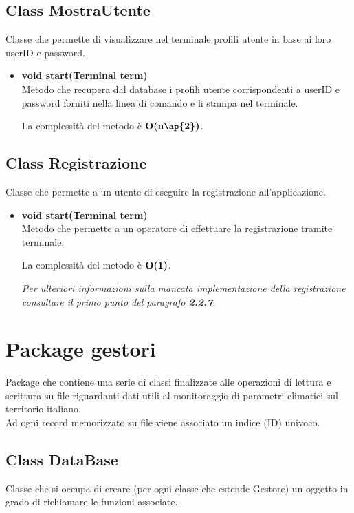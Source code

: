 \documentclass[a4paper, 12pt]{scrreprt}
\begin{document}
			\subsection{Class MostraUtente}
			Classe che permette di visualizzare nel terminale profili utente in base ai loro userID e password.
			\begin{itemize}
				\item \textbf{void start(Terminal term)}
				\\Metodo che recupera dal database i profili utente corrispondenti a userID e password  forniti nella linea di comando e li stampa nel terminale.
				
				La complessit\`a del metodo \`e $\bigO\textbf{(n\ap{2})}$.
				
			\end{itemize}
			\subsection{Class Registrazione}
			Classe che permette a un utente di eseguire la registrazione all'applicazione.
			\begin{itemize}
				\item \textbf{void start(Terminal term)}
				\\Metodo che permette a un operatore di effettuare la registrazione tramite terminale.
				
				La complessit\`a del metodo \`e $\mathbf{O}\textbf{(1)}$.
				
				\textsl{Per ulteriori informazioni sulla mancata implementazione della registrazione consultare il primo punto del paragrafo \textbf{2.2.7}.}
				
			\end{itemize}
		\pagebreak
		\section{Package gestori}
		Package che contiene una serie di classi finalizzate alle operazioni di lettura e scrittura su file riguardanti dati utili al monitoraggio di parametri climatici sul territorio italiano.\\
		Ad ogni record memorizzato su file viene associato un indice (ID) univoco.
			\subsection{Class DataBase}
			Classe che si occupa di creare (per ogni classe che estende Gestore) un oggetto in grado di richiamare le funzioni associate.
\end{document}
